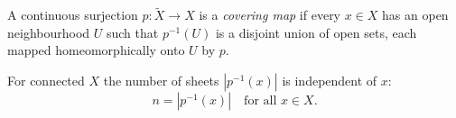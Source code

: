 
\begin{definition}
A continuous surjection $p\colon \tilde X \to X$ is a \emph{covering map} if every
$x\in X$ has an open neighbourhood $U$ such that $p^{-1}(U)$ is a disjoint union of
open sets, each mapped homeomorphically onto $U$ by $p$.
\end{definition}

For connected $X$ the number of sheets $|p^{-1}(x)|$ is independent of $x$:
\begin{equation}\label{eq:sheets}
  n = |p^{-1}(x)| \quad \text{for all } x \in X.
\end{equation}
